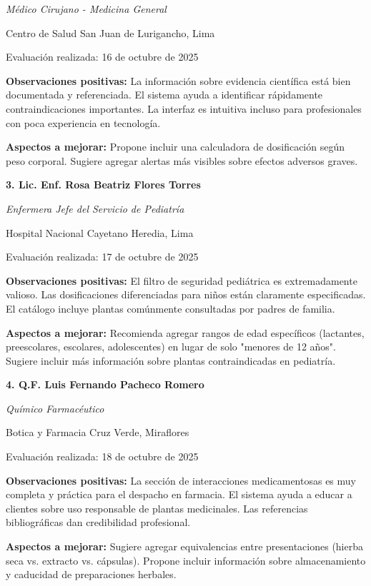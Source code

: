 \documentclass[12pt,a4paper]{article}
\begin{document}
\textit{Médico Cirujano - Medicina General}

Centro de Salud San Juan de Lurigancho, Lima

Evaluación realizada: 16 de octubre de 2025

\textbf{Observaciones positivas:} La información sobre evidencia científica está bien documentada y referenciada. El sistema ayuda a identificar rápidamente contraindicaciones importantes. La interfaz es intuitiva incluso para profesionales con poca experiencia en tecnología.

\textbf{Aspectos a mejorar:} Propone incluir una calculadora de dosificación según peso corporal. Sugiere agregar alertas más visibles sobre efectos adversos graves.

\vspace{0.3cm}

\textbf{3. Lic. Enf. Rosa Beatriz Flores Torres}

\textit{Enfermera Jefe del Servicio de Pediatría}

Hospital Nacional Cayetano Heredia, Lima

Evaluación realizada: 17 de octubre de 2025

\textbf{Observaciones positivas:} El filtro de seguridad pediátrica es extremadamente valioso. Las dosificaciones diferenciadas para niños están claramente especificadas. El catálogo incluye plantas comúnmente consultadas por padres de familia.

\textbf{Aspectos a mejorar:} Recomienda agregar rangos de edad específicos (lactantes, preescolares, escolares, adolescentes) en lugar de solo "menores de 12 años". Sugiere incluir más información sobre plantas contraindicadas en pediatría.

\vspace{0.3cm}

\textbf{4. Q.F. Luis Fernando Pacheco Romero}

\textit{Químico Farmacéutico}

Botica y Farmacia Cruz Verde, Miraflores

Evaluación realizada: 18 de octubre de 2025

\textbf{Observaciones positivas:} La sección de interacciones medicamentosas es muy completa y práctica para el despacho en farmacia. El sistema ayuda a educar a clientes sobre uso responsable de plantas medicinales. Las referencias bibliográficas dan credibilidad profesional.

\textbf{Aspectos a mejorar:} Sugiere agregar equivalencias entre presentaciones (hierba seca vs. extracto vs. cápsulas). Propone incluir información sobre almacenamiento y caducidad de preparaciones herbales.
\end{document}
